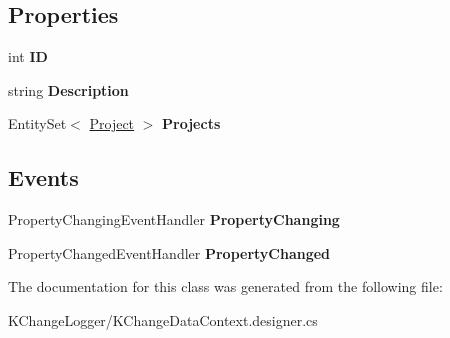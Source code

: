 \subsection*{Properties}
\begin{DoxyCompactItemize}
\item 
\hypertarget{class_k_change_logger_1_1_language_a37d63cb25338bec891a0e43ac5b2d85f}{int {\bfseries I\-D}}\label{class_k_change_logger_1_1_language_a37d63cb25338bec891a0e43ac5b2d85f}

\item 
\hypertarget{class_k_change_logger_1_1_language_a7a87779b703cdd3d2b8957f13a768730}{string {\bfseries Description}}\label{class_k_change_logger_1_1_language_a7a87779b703cdd3d2b8957f13a768730}

\item 
\hypertarget{class_k_change_logger_1_1_language_a905d721291a7cdbcb3bc4d647b5e1921}{Entity\-Set$<$ \hyperlink{class_k_change_logger_1_1_project}{Project} $>$ {\bfseries Projects}}\label{class_k_change_logger_1_1_language_a905d721291a7cdbcb3bc4d647b5e1921}

\end{DoxyCompactItemize}
\subsection*{Events}
\begin{DoxyCompactItemize}
\item 
\hypertarget{class_k_change_logger_1_1_language_a69b354c23051095dad5c6668039758aa}{Property\-Changing\-Event\-Handler {\bfseries Property\-Changing}}\label{class_k_change_logger_1_1_language_a69b354c23051095dad5c6668039758aa}

\item 
\hypertarget{class_k_change_logger_1_1_language_a8b6aa67bdf6bd685fc95421e0a771e2b}{Property\-Changed\-Event\-Handler {\bfseries Property\-Changed}}\label{class_k_change_logger_1_1_language_a8b6aa67bdf6bd685fc95421e0a771e2b}

\end{DoxyCompactItemize}


The documentation for this class was generated from the following file\-:\begin{DoxyCompactItemize}
\item 
K\-Change\-Logger/K\-Change\-Data\-Context.\-designer.\-cs\end{DoxyCompactItemize}
